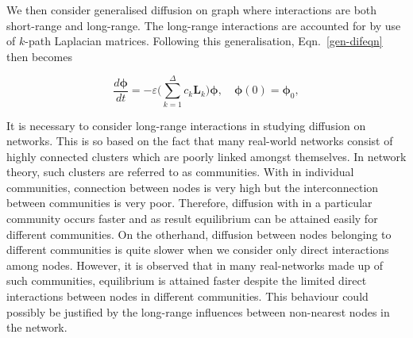 \documentclass[10pt,a4paper]{article}
\begin{document}
        
        We then consider generalised diffusion on graph where interactions are both short-range and long-range. The long-range interactions are accounted for by use of $k$-path Laplacian matrices. Following this generalisation, Eqn.~\ref{gen-difeqn} then becomes
        
        \begin{equation}
        \frac{d\boldsymbol{\phi}}{dt} =  -\varepsilon \Big(\sum_{k=1}^{\Delta}c_k\mathbf{L}_{k} \Big) \boldsymbol{\phi}, \quad \boldsymbol{\phi}(0) = \boldsymbol{\phi}_0 ,
        \label{kgen-difeqn}
        \end{equation}
        
        It is necessary to consider long-range interactions in studying diffusion on networks. This is so based on the fact that many real-world networks consist of highly connected clusters which are poorly linked amongst themselves. In network theory, such clusters are referred to as communities. With in individual communities, connection between nodes is very high but the interconnection between communities is very poor. Therefore, diffusion with in a particular community occurs faster and as result equilibrium can be attained easily for different communities. On the otherhand, diffusion between nodes belonging to different communities is quite slower when we consider only direct interactions among nodes. However, it is observed that in many real-networks made up of such communities, equilibrium is attained faster despite the limited direct interactions between nodes in different communities. This behaviour could possibly be justified by the long-range influences between non-nearest nodes in the network.
        
\end{document}
